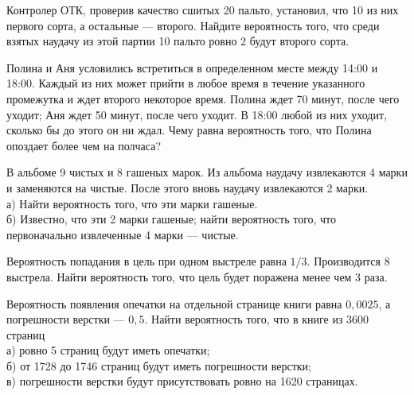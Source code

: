 \newpage\setcounter{zad}{0}



\begin{zkrW}{20}\noindent 
	Контролер ОТК, проверив качество сшитых 20 пальто, установил, что 10 из них первого сорта, а остальные --- второго. Найдите вероятность того, что среди взятых наудачу из этой партии 10 пальто ровно 2 будут второго сорта.
 
\end{zkrW}

\begin{zkrW}{20}\noindent 
	Полина и Аня условились встретиться в определенном месте между 14:00 и 18:00. Каждый из них может прийти в любое время в течение указанного промежутка и ждет второго некоторое время. Полина ждет 70 минут, после чего уходит; Аня ждет 50 минут, после чего уходит. В 18:00 любой из них уходит, сколько бы до этого он ни ждал. Чему равна вероятность того, что Полина опоздает более чем на полчаса?
 
\end{zkrW}

\begin{zkrW}{20}\noindent 
	В альбоме 9 чистых и 8 гашеных марок. Из альбома наудачу извлекаются 4 марки и заменяются на чистые. После этого вновь наудачу извлекаются 2 марки. \\ \indent а) Найти вероятность того, что эти марки гашеные. \\ \indent б) Известно, что эти 2 марки гашеные; найти вероятность того, что первоначально извлеченные 4 марки --- чистые.
 
\end{zkrW}

\begin{zkrW}{20}\noindent 
	Вероятность попадания в цель при одном выстреле равна $1/3$. Производится 8 выстрела. Найти вероятность того, что цель будет поражена менее чем 3 раза.
 
\end{zkrW}

\begin{zkrW}{20}\noindent 
	Вероятность появления опечатки на отдельной странице книги равна $0{,}0025$, а погрешности верстки --- $0{,}5$. Найти вероятность того, что в книге из 3600 страниц \\ \indent а) ровно 5 страниц будут иметь опечатки; \\ \indent б) от 1728 до 1746 страниц будут иметь погрешности верстки; \\ \indent в) погрешности верстки будут присутствовать ровно на 1620 страницах.
 
\end{zkrW}

